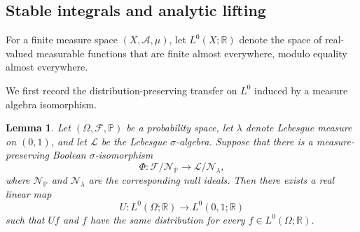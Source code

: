 \documentclass[10pt,a4paper]{amsart}
\newtheorem{lemma}[theorem]{Lemma}
\newcommand{\R}{\mathbb{R}}
\begin{document}
\subsection{Stable integrals and analytic lifting}
\label{subsec:stable-lift}

For a finite measure space \((X,\mathcal A,\mu)\), let
\(L^0(X;\R)\) denote the space of real-valued measurable functions
that are finite almost everywhere, modulo equality almost everywhere.

We first record the distribution-preserving transfer on \(L^0\)
induced by a measure algebra isomorphism.

\begin{lemma}
\label{lem:L0-transfer}
Let \((\Omega,\mathcal F,\mathbb P)\) be a probability space, let
\(\lambda\) denote Lebesgue measure on \((0,1)\), and let
\(\mathcal L\) be the Lebesgue \(\sigma\)-algebra. Suppose that there
is a measure-preserving Boolean \(\sigma\)-isomorphism
\[
        \Phi:
        \mathcal F/\mathcal N_{\mathbb P}
        \longrightarrow
        \mathcal L/\mathcal N_\lambda,
\]
where \(\mathcal N_{\mathbb P}\) and \(\mathcal N_\lambda\) are the
corresponding null ideals. Then there exists a real linear map
\[
        U:L^0(\Omega;\R)\longrightarrow L^0(0,1;\R)
\]
such that \(Uf\) and \(f\) have the same distribution for every
\(f\in L^0(\Omega;\R)\).
\end{lemma}
\end{document}
